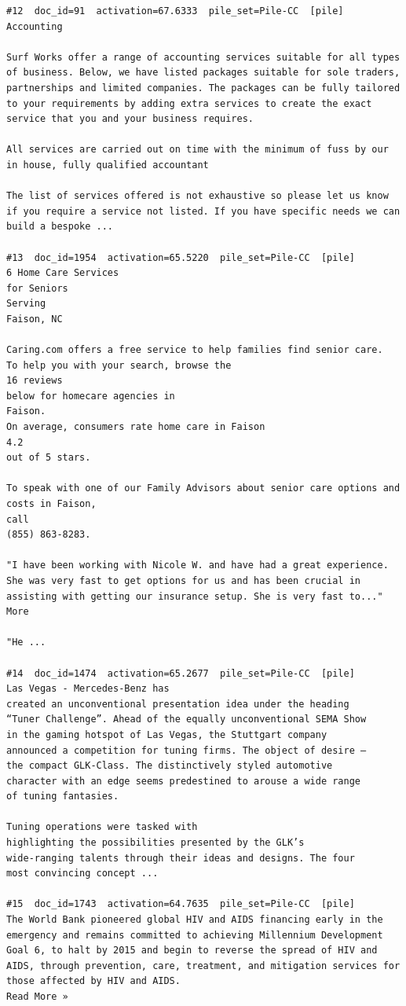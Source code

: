 \begin{verbatim}
#12  doc_id=91  activation=67.6333  pile_set=Pile-CC  [pile]
Accounting

Surf Works offer a range of accounting services suitable for all types of business. Below, we have listed packages suitable for sole traders, partnerships and limited companies. The packages can be fully tailored to your requirements by adding extra services to create the exact service that you and your business requires.

All services are carried out on time with the minimum of fuss by our in house, fully qualified accountant

The list of services offered is not exhaustive so please let us know if you require a service not listed. If you have specific needs we can build a bespoke ...

#13  doc_id=1954  activation=65.5220  pile_set=Pile-CC  [pile]
6 Home Care Services
for Seniors
Serving
Faison, NC

Caring.com offers a free service to help families find senior care.
To help you with your search, browse the
16 reviews
below for homecare agencies in
Faison.
On average, consumers rate home care in Faison
4.2
out of 5 stars.

To speak with one of our Family Advisors about senior care options and costs in Faison,
call
(855) 863-8283.

"I have been working with Nicole W. and have had a great experience. She was very fast to get options for us and has been crucial in assisting with getting our insurance setup. She is very fast to..." More

"He ...

#14  doc_id=1474  activation=65.2677  pile_set=Pile-CC  [pile]
Las Vegas - Mercedes-Benz has
created an unconventional presentation idea under the heading
“Tuner Challenge”. Ahead of the equally unconventional SEMA Show
in the gaming hotspot of Las Vegas, the Stuttgart company
announced a competition for tuning firms. The object of desire –
the compact GLK-Class. The distinctively styled automotive
character with an edge seems predestined to arouse a wide range
of tuning fantasies.

Tuning operations were tasked with
highlighting the possibilities presented by the GLK’s
wide-ranging talents through their ideas and designs. The four
most convincing concept ...

#15  doc_id=1743  activation=64.7635  pile_set=Pile-CC  [pile]
The World Bank pioneered global HIV and AIDS financing early in the emergency and remains committed to achieving Millennium Development Goal 6, to halt by 2015 and begin to reverse the spread of HIV and AIDS, through prevention, care, treatment, and mitigation services for those affected by HIV and AIDS.
Read More »


\end{verbatim}
